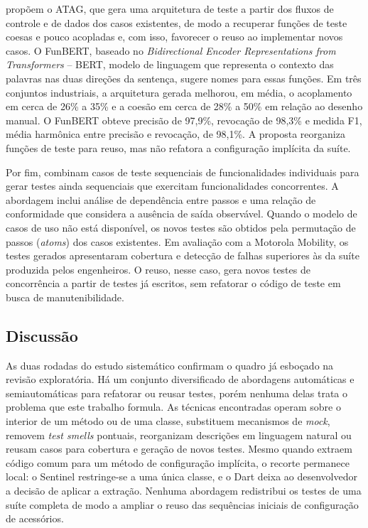  propõem o ATAG, que gera uma arquitetura de teste a partir dos fluxos de controle e de dados dos casos existentes, de modo a recuperar funções de teste coesas e pouco acopladas e, com isso, favorecer o reuso ao implementar novos casos. O FunBERT, baseado no \textit{Bidirectional Encoder Representations from Transformers} -- BERT, modelo de linguagem que representa o contexto das palavras nas duas direções da sentença, sugere nomes para essas funções. Em três conjuntos industriais, a arquitetura gerada melhorou, em média, o acoplamento em cerca de 26\% a 35\% e a coesão em cerca de 28\% a 50\% em relação ao desenho manual. O FunBERT obteve precisão de 97,9\%, revocação de 98,3\% e medida F1, média harmônica entre precisão e revocação, de 98,1\%. A proposta reorganiza funções de teste para reuso, mas não refatora a configuração implícita da suíte.

Por fim,  combinam casos de teste sequenciais de funcionalidades individuais para gerar testes ainda sequenciais que exercitam funcionalidades concorrentes. A abordagem inclui análise de dependência entre passos e uma relação de conformidade que considera a ausência de saída observável. Quando o modelo de casos de uso não está disponível, os novos testes são obtidos pela permutação de passos (\textit{atoms}) dos casos existentes. Em avaliação com a Motorola Mobility, os testes gerados apresentaram cobertura e detecção de falhas superiores às da suíte produzida pelos engenheiros. O reuso, nesse caso, gera novos testes de concorrência a partir de testes já escritos, sem refatorar o código de teste em busca de manutenibilidade.

\subsection{Discussão}

As duas rodadas do estudo sistemático confirmam o quadro já esboçado na revisão exploratória. Há um conjunto diversificado de abordagens automáticas e semiautomáticas para refatorar ou reusar testes, porém nenhuma delas trata o problema que este trabalho formula. As técnicas encontradas operam sobre o interior de um método ou de uma classe, substituem mecanismos de \textit{mock}, removem \textit{test smells} pontuais, reorganizam descrições em linguagem natural ou reusam casos para cobertura e geração de novos testes. Mesmo quando extraem código comum para um método de configuração implícita, o recorte permanece local: o Sentinel restringe-se a uma única classe, e o Dart deixa ao desenvolvedor a decisão de aplicar a extração. Nenhuma abordagem redistribui os testes de uma suíte completa de modo a ampliar o reuso das sequências iniciais de configuração de acessórios.

